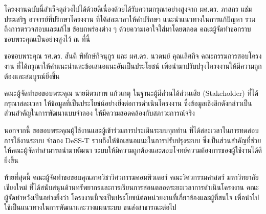 \begin{acknowledgments}
\begin{mypara}
    \indent โครงงานฉบับนี้สำเร็จลุล่วงไปได้ด้วยดีเนื่องด้วยได้รับความกรุณาอย่างสูงจาก ผศ.ดร. ภาสกร แช่มประเสริฐ 
อาจารย์ที่ปรึกษาโครงงาน ที่ได้สละเวลาให้คำปรึกษา แนะนำแนวทางในการแก้ปัญหา รวมถึงการตรวจสอบและแก้ไข
ข้อบกพร่องต่าง ๆ ด้วยความเอาใจใส่มาโดยตลอด คณะผู้จัดทำขอกราบขอบพระคุณเป็นอย่างสูงไว้ ณ ที่นี้

\indent ขอขอบพระคุณ รศ.ดร. สันติ พิทักษ์กิจนุกูร และ ผศ.ดร. นวดนย์ คุณเลิศกิจ คณะกรรมการสอบโครงงาน 
ที่ได้กรุณาให้คำแนะนำและข้อเสนอแนะอันเป็นประโยชน์ เพื่อนำมาปรับปรุงโครงงานให้มีความถูกต้องและสมบูรณ์ยิ่งขึ้น

\indent คณะผู้จัดทำขอขอบพระคุณ นายมิตรภาพ แก้วเกตุ ในฐานะผู้มีส่วนได้ส่วนเสีย (Stakeholder) ที่ได้กรุณาสละเวลา
ให้ข้อมูลที่เป็นประโยชน์อย่างยิ่งต่อการดำเนินโครงงาน ซึ่งข้อมูลเชิงลึกดังกล่าวเป็นส่วนสำคัญในการพัฒนาแบบจำลอง
ให้มีความสอดคล้องกับสภาวะการณ์จริง

\indent นอกจากนี้ ขอขอบพระคุณผู้ใช้งานและผู้เข้าร่วมการประเมินระบบทุกท่าน ที่ได้สละเวลาในการทดสอบการใช้งานระบบ
จำลอง DeSS-T รวมถึงให้ข้อเสนอแนะในการปรับปรุงระบบ ซึ่งเป็นส่วนสำคัญที่ช่วยให้คณะผู้จัดทำสามารถนำมาพัฒนา
ระบบให้มีความถูกต้องและตอบโจทย์ความต้องการของผู้ใช้งานได้ดียิ่งขึ้น

\indent ท้ายที่สุดนี้ คณะผู้จัดทำขอขอบคุณภาควิชาวิศวกรรมคอมพิวเตอร์ คณะวิศวกรรมศาสตร์ มหาวิทยาลัยเชียงใหม่ 
ที่ได้สนับสนุนด้านทรัพยากรและการเรียนการสอนตลอดระยะเวลาการดำเนินโครงงาน คณะผู้จัดทำหวังเป็นอย่างยิ่งว่า
โครงงานนี้จะเป็นประโยชน์ต่อหน่วยงานที่เกี่ยวข้องและผู้ที่สนใจ เพื่อนำไปใช้เป็นแนวทางในการพัฒนาและวางแผนระบบ
ขนส่งสาธารณะต่อไป
\end{mypara}

\end{acknowledgments}%
\fi %

\contentspage

\ifproject
\figurelistpage

\tablelistpage
\fi %



